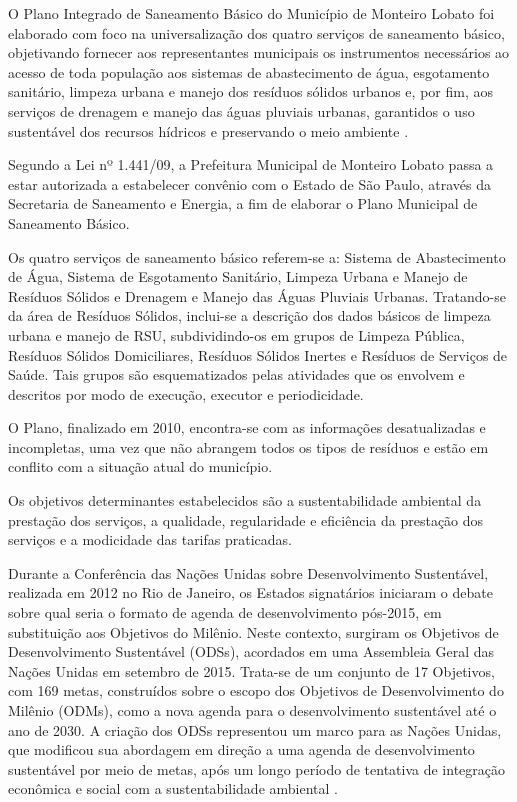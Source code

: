 	O Plano Integrado de Saneamento Básico do Município de Monteiro Lobato foi elaborado com foco na universalização dos quatro serviços de saneamento básico, objetivando fornecer aos representantes municipais os instrumentos necessários ao acesso de toda população aos sistemas de abastecimento de água, esgotamento sanitário, limpeza urbana e manejo dos resíduos sólidos urbanos e, por fim, aos serviços de drenagem e manejo das águas pluviais urbanas, garantidos o uso sustentável dos recursos hídricos e preservando o meio ambiente \cite{MonteiroLobato}. %
	
	Segundo a Lei nº 1.441/09, a Prefeitura Municipal de Monteiro Lobato passa a estar autorizada a estabelecer convênio com o Estado de São Paulo, através da Secretaria de Saneamento e Energia, a fim de elaborar o Plano Municipal de Saneamento Básico.
	
	Os quatro serviços de saneamento básico referem-se a: Sistema de Abastecimento de Água, Sistema de Esgotamento Sanitário, Limpeza Urbana e Manejo de Resíduos Sólidos e Drenagem e Manejo das Águas Pluviais Urbanas. Tratando-se da área de Resíduos Sólidos, inclui-se a descrição dos dados básicos de limpeza urbana e manejo de RSU, subdividindo-os em grupos de Limpeza Pública, Resíduos Sólidos Domiciliares, Resíduos Sólidos Inertes e Resíduos de Serviços de Saúde. Tais grupos são esquematizados pelas atividades que os envolvem e descritos por modo de execução, executor e periodicidade.
	
	O Plano, finalizado em 2010, encontra-se com as informações desatualizadas e incompletas, uma vez que não abrangem todos os tipos de resíduos e estão em conflito com a situação atual do município.
	
	Os objetivos determinantes estabelecidos são a sustentabilidade ambiental da prestação dos serviços, a qualidade, regularidade e eficiência da prestação dos serviços e a modicidade das tarifas praticadas.
	
	Durante a Conferência das Nações Unidas sobre Desenvolvimento Sustentável, realizada em 2012 no Rio de Janeiro, os Estados signatários iniciaram o debate sobre qual seria o formato de agenda de desenvolvimento pós-2015, em substituição aos Objetivos do Milênio. Neste contexto, surgiram os Objetivos de Desenvolvimento Sustentável (ODSs), acordados em uma Assembleia Geral das Nações Unidas em setembro de 2015. Trata-se de um conjunto de 17 Objetivos, com 169 metas, construídos sobre o escopo dos Objetivos de Desenvolvimento do Milênio (ODMs), como a nova agenda para o desenvolvimento sustentável até o ano de 2030. A criação dos ODSs representou um marco para as Nações Unidas, que modificou sua abordagem em direção a uma agenda de desenvolvimento sustentável por meio de metas, após um longo período de tentativa de integração econômica e social com a sustentabilidade ambiental \cite{biermann2017global}.
	
